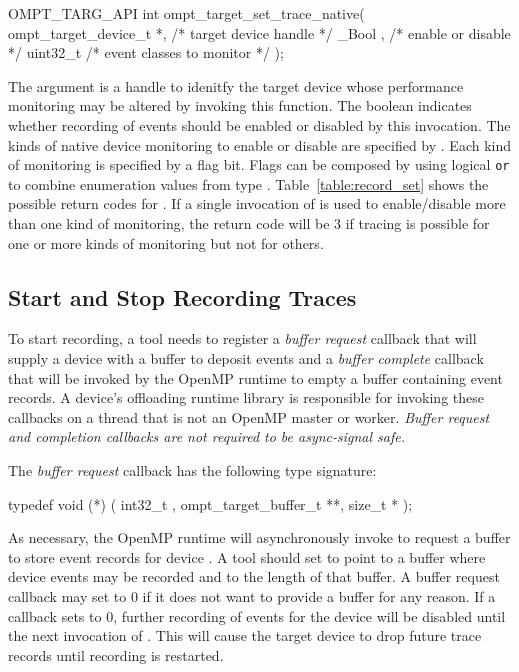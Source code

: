 \documentclass{article}
\begin{document}
\begin{boxedcode}
OMPT\_TARG\_API int ompt\_target\_set\_trace\_native(
  ompt\_target\_device\_t *,                     /* target device handle       */
  \_Bool ,                                     /* enable or disable          */
  uint32\_t                                     /* event classes to monitor   */
);
\end{boxedcode}
The argument  is a handle to idenitfy the target device whose performance monitoring may be altered by invoking this function. 
The boolean  indicates whether recording of events should be enabled or disabled by this invocation.
The kinds of native device monitoring to enable or disable are specified by . Each kind of monitoring is specified by a flag bit. Flags can be composed by using logical {\tt or}  to combine enumeration values from type .
Table~\ref{table:record_set} shows the possible return codes for .
If a single invocation of  is used to enable/disable more than one kind of monitoring, 
the return code will be 3 if tracing is possible for one or more kinds of monitoring but not for others.

\subsection{Start and Stop Recording Traces}
\label{sec:start-stop-recording}

To start recording, a tool needs to register a \emph{buffer request} callback that will supply a device with a buffer to deposit events and a \emph{buffer complete} callback that will be invoked by the OpenMP runtime to empty a buffer containing event records. A device's offloading runtime library is responsible for invoking these callbacks on a thread that is not an OpenMP master or worker. {\em Buffer request and completion callbacks are not required to  be async-signal safe.}

The \emph{buffer request} callback has the following type signature:
\begin{boxedcode}
typedef void (*) (
  int32\_t ,
  ompt\_target\_buffer\_t **,
  size\_t *
);
\end{boxedcode}
As necessary, the OpenMP runtime will asynchronously invoke  to request a buffer to store event records for device .
A tool should set  to point to a buffer where device events may be recorded and  to the length of that buffer.
A buffer request callback  may set  to 0 if it does not want to provide a buffer for any reason. If a callback sets  to 0, further recording of events for the device will be disabled until the next invocation of . This will cause the target device to drop future trace records until recording is restarted.
\end{document}
